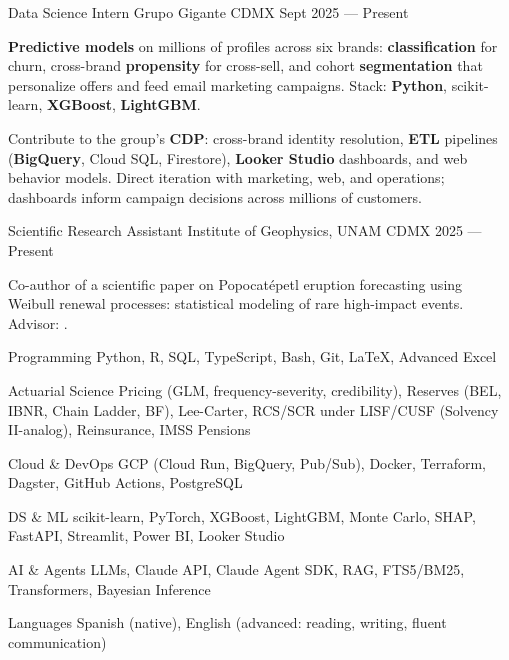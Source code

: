 \documentclass[10pt, letterpaper]{awesome-cv}
\begin{document}
\begin{cventries}

  \cventry
    {Data Science Intern}
    {Grupo Gigante}
    {CDMX}
    {Sept 2025 — Present}
    {
      \begin{cvitems}
        \item {\textbf{Predictive models} on millions of profiles across six brands: \textbf{classification} for churn, cross-brand \textbf{propensity} for cross-sell, and cohort \textbf{segmentation} that personalize offers and feed email marketing campaigns. Stack: \textbf{Python}, scikit-learn, \textbf{XGBoost}, \textbf{LightGBM}.}
        \item {Contribute to the group's \textbf{CDP}: cross-brand identity resolution, \textbf{ETL} pipelines (\textbf{BigQuery}, Cloud SQL, Firestore), \textbf{Looker Studio} dashboards, and web behavior models. Direct iteration with marketing, web, and operations; dashboards inform campaign decisions across millions of customers.}
      \end{cvitems}
    }

  \cventry
    {Scientific Research Assistant }
    {Institute of Geophysics, UNAM}
    {CDMX}
    {2025 — Present}
    {
      \begin{cvitems}
        \item {Co-author of a scientific paper on Popocatépetl eruption forecasting using Weibull renewal processes: statistical modeling of rare high-impact events. Advisor: .}
      \end{cvitems}
    }

\end{cventries}


\begin{cvskills}
  \cvskill
    {Programming}
    {Python, R, SQL, TypeScript, Bash, Git, \LaTeX, Advanced Excel}

  \cvskill
    {Actuarial Science}
    {Pricing (GLM, frequency-severity, credibility), Reserves (BEL, IBNR, Chain Ladder, BF), Lee-Carter, RCS/SCR under LISF/CUSF (Solvency II-analog), Reinsurance, IMSS Pensions}

  \cvskill
    {Cloud \& DevOps}
    {GCP (Cloud Run, BigQuery, Pub/Sub), Docker, Terraform, Dagster, GitHub Actions, PostgreSQL}

  \cvskill
    {DS \& ML}
    {scikit-learn, PyTorch, XGBoost, LightGBM, Monte Carlo, SHAP, FastAPI, Streamlit, Power BI, Looker Studio}

  \cvskill
    {AI \& Agents}
    {LLMs, Claude API, Claude Agent SDK, RAG, FTS5/BM25, Transformers, Bayesian Inference}

  \cvskill
    {Languages}
    {Spanish (native), English (advanced: reading, writing, fluent communication)}
\end{cvskills}
\end{document}
